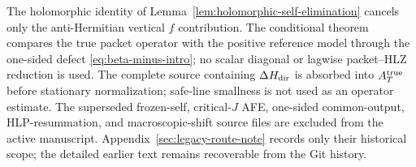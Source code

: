 The holomorphic identity of Lemma~\ref{lem:holomorphic-self-elimination}
cancels only the anti-Hermitian vertical $f$ contribution.  The conditional
theorem compares the true packet operator with the positive reference model
through the one-sided defect \eqref{eq:beta-minus-intro}; no scalar diagonal or
lagwise packet--HLZ reduction is used.  The complete source containing
$\Delta H_{\rm dir}$ is absorbed into $A_T^{\rm true}$ before stationary
normalization; safe-line smallness is not used as an operator estimate.  The
superseded frozen-self, critical-$J$ AFE, one-sided common-output,
HLP-resummation, and macroscopic-shift source files are excluded from the
active manuscript.  Appendix~\ref{sec:legacy-route-note} records only their
historical scope; the detailed earlier text remains recoverable from the Git
history.
